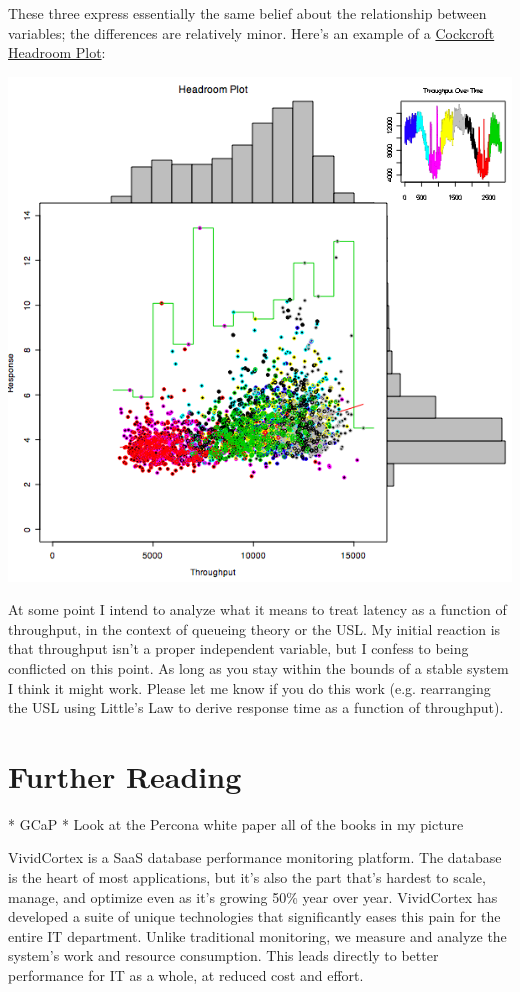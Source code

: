 \documentclass{vivid_layout}
\begin{document}
These three express essentially the same belief about the relationship between
variables; the differences are relatively minor. Here's an example of a
\href{http://perfcap.blogspot.nl/2008/07/enhanced-headroom-plot-in-r.html}{Cockcroft
Headroom Plot}:
\begin{center}
\includegraphics[width=.75\linewidth]{scalability/chpblog3}
\end{center}

At some point I intend to analyze what it means to treat latency as a
function of throughput, in the context of queueing theory or the USL. My initial
reaction is that throughput isn't a proper independent variable, but I confess
to being conflicted on this point. As long as you stay within the bounds of a
stable system I think it might work. Please let me know if you do this work
(e.g. rearranging the USL using Little's Law to derive response time as a
function of throughput).

\section{Further Reading}
				    * GCaP
					     * Look at the Percona white paper
						  all of the books in my picture

\newpage

\begin{about}	%
VividCortex is a SaaS database performance monitoring platform. The database is the heart of most applications, but it's also the part that's hardest to scale, manage, and optimize even as it's growing 50\% year over year. VividCortex has developed a suite of unique technologies that significantly eases this pain for the entire IT department. Unlike traditional monitoring, we measure
and analyze the system's work and resource consumption. This leads directly to better performance for IT as a whole, at reduced cost and effort.
\end{about}
\makeresources	%
\end{document}
